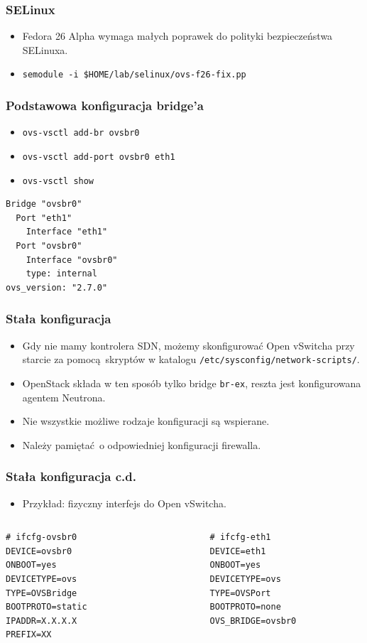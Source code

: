 \documentclass[dvipsnames,table]{beamer}
\begin{document}
\begin{frame}
\frametitle{SELinux}
\begin{itemize}
	\item Fedora 26 Alpha wymaga małych poprawek do polityki bezpieczeństwa SELinuxa.
	\item {\tt semodule -i \$HOME/lab/selinux/ovs-f26-fix.pp}
\end{itemize}	
\end{frame}

\begin{frame}[fragile]
\frametitle{Podstawowa konfiguracja bridge'a}
\begin{itemize}
	\item {\tt ovs-vsctl add-br ovsbr0}
	\item {\tt ovs-vsctl add-port ovsbr0 eth1}
	\item {\tt ovs-vsctl show}
\end{itemize}
	\scriptsize
\begin{verbatim}
Bridge "ovsbr0"
  Port "eth1"
    Interface "eth1"
  Port "ovsbr0"
    Interface "ovsbr0"
    type: internal
ovs_version: "2.7.0"
\end{verbatim}
\end{frame}
	
\begin{frame}
\frametitle{Stała konfiguracja}
\begin{itemize}
	\item Gdy nie mamy kontrolera SDN, możemy skonfigurować Open vSwitcha przy starcie za pomocą skryptów w katalogu {\tt /etc/sysconfig/network-scripts/}.
	\item OpenStack składa w ten sposób tylko bridge {\tt br-ex}, reszta jest konfigurowana agentem Neutrona. 
	\item Nie wszystkie możliwe rodzaje konfiguracji są wspierane.
	\item Należy pamiętać o odpowiedniej konfiguracji firewalla.
\end{itemize}
\end{frame}

\begin{frame}[fragile]
\frametitle{Stała konfiguracja c.d.}
\begin{itemize}
	\item Przykład: fizyczny interfejs do Open vSwitcha.
\end{itemize}
\begin{columns}
	\begin{column}{0.5\textwidth}
		\begin{verbatim}
# ifcfg-ovsbr0
DEVICE=ovsbr0
ONBOOT=yes
DEVICETYPE=ovs
TYPE=OVSBridge
BOOTPROTO=static
IPADDR=X.X.X.X
PREFIX=XX
		\end{verbatim}
	\end{column}
	\begin{column}{0.5\textwidth}
		\begin{verbatim}
		# ifcfg-eth1
		DEVICE=eth1
		ONBOOT=yes
		DEVICETYPE=ovs
		TYPE=OVSPort
		BOOTPROTO=none
		OVS_BRIDGE=ovsbr0
		\end{verbatim}
	\end{column}
\end{columns}
\end{frame}
\end{document}
